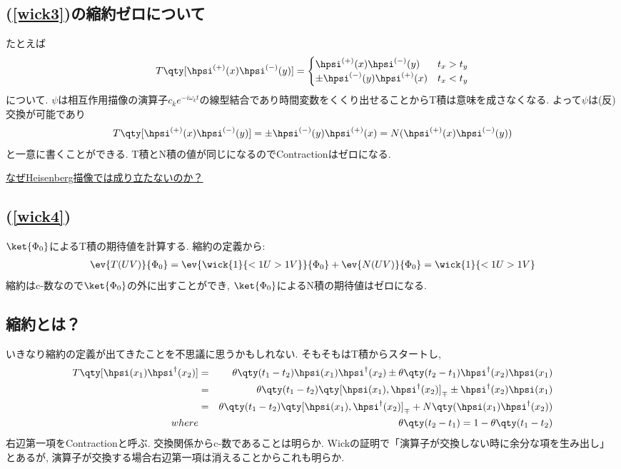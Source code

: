\documentclass[10.5pt,a4paper]{jreport}
\begin{document}
\subsection{(\ref{wick3})の縮約ゼロについて}
たとえば
\begin{eqnarray}
  T\qty[\hpsi^{(+)}(x)\hpsi^{(-)}(y)] = \begin{cases}
    \hpsi^{(+)}(x)\hpsi^{(-)}(y) & t_x > t_y\\
    \pm\hpsi^{(-)}(y)\hpsi^{(+)}(x) & t_x < t_y
  \end{cases}
\end{eqnarray}
について. $\psi$は相互作用描像の演算子$c_ke^{-i\omega_k t}$の線型結合であり時間変数をくくり出せることからT積は意味を成さなくなる. よって$\psi$は(反)交換が可能であり
\begin{eqnarray}
  T\qty[\hpsi^{(+)}(x)\hpsi^{(-)}(y)] = \pm\hpsi^{(-)}(y)\hpsi^{(+)}(x) = N(\hpsi^{(+)}(x)\hpsi^{(-)}(y))
\end{eqnarray}
と一意に書くことができる. T積とN積の値が同じになるのでContractionはゼロになる.

\ul{なぜHeisenberg描像では成り立たないのか？}
\subsection{(\ref{wick4})}
$\ket{\Phi_0}$によるT積の期待値を計算する. 縮約の定義から:
\begin{eqnarray}
  \ev{T(UV)}{\Phi_0} = \ev{\wick{1}{<1U >1V}}{\Phi_0} + \ev{N(UV)}{\Phi_0} = \wick{1}{<1U >1V}
\end{eqnarray}
縮約はc-数なので$\ket{\Phi_0}$の外に出すことができ, $\ket{\Phi_0}$によるN積の期待値はゼロになる. 
\subsection{縮約とは？}
いきなり縮約の定義が出てきたことを不思議に思うかもしれない. そもそもはT積からスタートし,
\begin{eqnarray}
  T\qty[\hpsi(x_1)\hpsi^\dagger(x_2)] &=& \theta\qty(t_1 - t_2)\hpsi(x_1)\hpsi^\dagger(x_2) \pm \theta\qty(t_2 - t_1)\hpsi^\dagger(x_2)\hpsi(x_1)\\
  &=& \theta\qty(t_1 - t_2)\qty[\hpsi(x_1), \hpsi^\dagger(x_2)]_{\mp} \pm \hpsi^\dagger(x_2)\hpsi(x_1)\\
  &=& \theta\qty(t_1 - t_2)\qty[\hpsi(x_1), \hpsi^\dagger(x_2)]_{\mp} + N\qty(\hpsi(x_1)\hpsi^\dagger(x_2))\\
  \nonumber  where &&\theta\qty(t_2 - t_1) = 1 - \theta\qty(t_1 - t_2)
\end{eqnarray}
右辺第一項をContractionと呼ぶ. 交換関係からc-数であることは明らか. Wickの証明で「演算子が交換しない時に余分な項を生み出し」とあるが, 演算子が交換する場合右辺第一項は消えることからこれも明らか.
\end{document}
